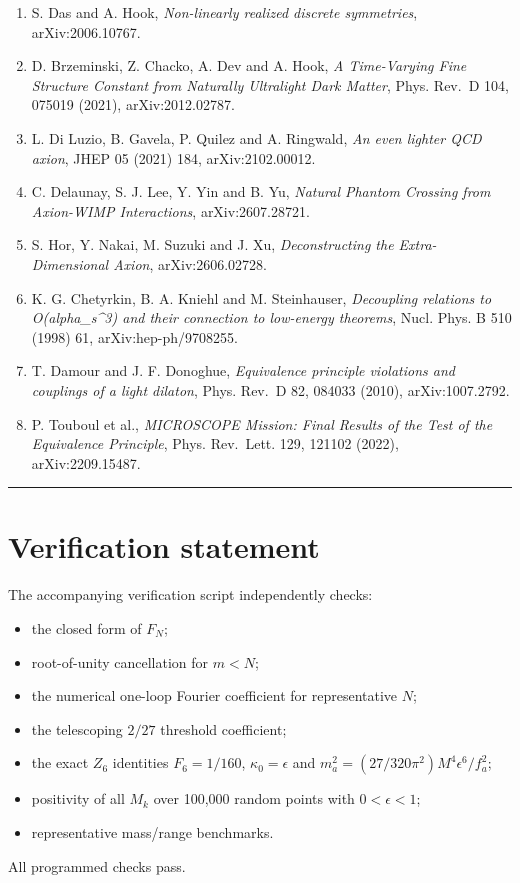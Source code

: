\documentclass[11pt,a4paper]{article}
\providecommand{\tightlist}{\setlength{\itemsep}{0pt}\setlength{\parskip}{0pt}}
\begin{document}
\begin{enumerate}
\def\labelenumi{\arabic{enumi}.}
\tightlist
\item
  S. Das and A. Hook, \emph{Non-linearly realized discrete symmetries},
  arXiv:2006.10767.
\item
  D. Brzeminski, Z. Chacko, A. Dev and A. Hook, \emph{A Time-Varying
  Fine Structure Constant from Naturally Ultralight Dark Matter}, Phys.
  Rev.~D 104, 075019 (2021), arXiv:2012.02787.
\item
  L. Di Luzio, B. Gavela, P. Quilez and A. Ringwald, \emph{An even
  lighter QCD axion}, JHEP 05 (2021) 184, arXiv:2102.00012.
\item
  C. Delaunay, S. J. Lee, Y. Yin and B. Yu, \emph{Natural Phantom
  Crossing from Axion-WIMP Interactions}, arXiv:2607.28721.
\item
  S. Hor, Y. Nakai, M. Suzuki and J. Xu, \emph{Deconstructing the
  Extra-Dimensional Axion}, arXiv:2606.02728.
\item
  K. G. Chetyrkin, B. A. Kniehl and M. Steinhauser, \emph{Decoupling
  relations to O(alpha\_s\^{}3) and their connection to low-energy
  theorems}, Nucl. Phys. B 510 (1998) 61, arXiv:hep-ph/9708255.
\item
  T. Damour and J. F. Donoghue, \emph{Equivalence principle violations
  and couplings of a light dilaton}, Phys. Rev.~D 82, 084033 (2010),
  arXiv:1007.2792.
\item
  P. Touboul et al., \emph{MICROSCOPE Mission: Final Results of the Test
  of the Equivalence Principle}, Phys. Rev.~Lett. 129, 121102 (2022),
  arXiv:2209.15487.
\end{enumerate}

\begin{center}\rule{0.5\linewidth}{0.5pt}\end{center}

\section{Verification statement}\label{verification-statement}

The accompanying verification script independently checks:

\begin{itemize}
\tightlist
\item
  the closed form of \(F_N\);
\item
  root-of-unity cancellation for \(m<N\);
\item
  the numerical one-loop Fourier coefficient for representative \(N\);
\item
  the telescoping \(2/27\) threshold coefficient;
\item
  the exact \(Z_6\) identities \(F_6=1/160\), \(\kappa_0=\epsilon\) and
  \(m_a^2=(27/320\pi^2)M^4\epsilon^6/f_a^2\);
\item
  positivity of all \(M_k\) over 100,000 random points with
  \(0<\epsilon<1\);
\item
  representative mass/range benchmarks.
\end{itemize}

All programmed checks pass.
\end{document}
